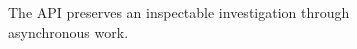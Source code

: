 \begin{figure}[H]
\centering
{}
\caption{The API preserves an inspectable investigation through asynchronous work.}\label{fig:teach-M08-07}
\end{figure}
